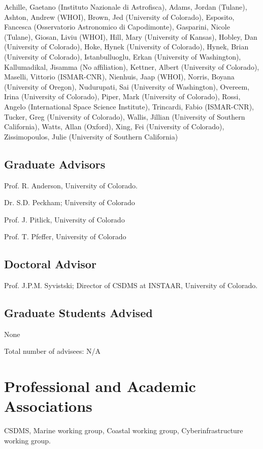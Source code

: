 \documentclass[letterpaper]{resume}
\begin{document}
  Achille, Gaetano (Instituto Nazionale di Astrofisca),
  Adams, Jordan (Tulane),
  Ashton, Andrew  (WHOI),
  Brown, Jed (University of Colorado),
  Esposito, Fancesca (Osservatorio Astronomico di Capodimonte),
  Gasparini, Nicole (Tulane),
  Giosan, Liviu (WHOI),
  Hill, Mary (University of Kansas),
  Hobley, Dan (University of Colorado),
  Hoke, Hynek (University of Colorado),
  Hynek, Brian (University of Colorado),
  Istanbulluoglu, Erkan (University of Washington),
  Kallumadikal, Jisamma (No affiliation),
  Kettner, Albert (University of Colorado),
  Maselli, Vittorio (ISMAR-CNR),
  Nienhuis, Jaap (WHOI),
  Norris, Boyana (University of Oregon),
  Nudurupati, Sai (University of Washington),
  Overeem, Irina (University of Colorado),
  Piper, Mark (University of Colorado),
  Rossi, Angelo (International Space Science Institute),
  Trincardi, Fabio (ISMAR-CNR),
  Tucker, Greg (University of Colorado),
  Wallis, Jillian (University of Southern California),
  Watts, Allan (Oxford),
  Xing, Fei (University of Colorado),
  Zissimopoulos, Julie (University of Southern California)


\subsection{Graduate Advisors}
\begin{multicols}{2}
\begin{compactitem}[\itembullet]
  \item Prof. R. Anderson, University of Colorado.
  \item Dr. S.D. Peckham; University of Colorado
  \item Prof. J. Pitlick, University of Colorado
  \item Prof. T. Pfeffer, University of Colorado
\end{compactitem}
\end{multicols}

\subsection{Doctoral Advisor}
\begin{compactitem}[\itembullet]
  \item Prof. J.P.M. Syvistski; Director of CSDMS at INSTAAR, University of Colorado.
\end{compactitem}

\subsection{Graduate Students Advised}
\begin{compactitem}[\itembullet]
  \item None
  \item Total number of advisees: N/A
\end{compactitem}

\section{Professional and Academic Associations}

CSDMS, Marine working group, Coastal working group, Cyberinfrastructure working group.

\nocite{}
\end{document}

